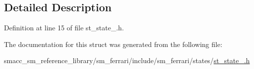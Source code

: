 \subsection{Detailed Description}


Definition at line 15 of file st\+\_\+state\+\_.\+h.



The documentation for this struct was generated from the following file\+:\begin{DoxyCompactItemize}
\item 
smacc\+\_\+sm\+\_\+reference\+\_\+library/sm\+\_\+ferrari/include/sm\+\_\+ferrari/states/\hyperlink{sm__ferrari_2include_2sm__ferrari_2states_2st__state__2_8h}{st\+\_\+state\+\_.\+h}\end{DoxyCompactItemize}
